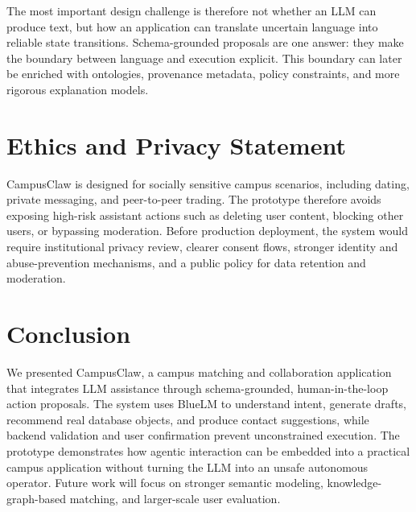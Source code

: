 \documentclass[sigconf]{acmart}
\begin{document}
The most important design challenge is therefore not whether an LLM can produce text, but how an application can translate uncertain language into reliable state transitions. Schema-grounded proposals are one answer: they make the boundary between language and execution explicit. This boundary can later be enriched with ontologies, provenance metadata, policy constraints, and more rigorous explanation models.

\section{Ethics and Privacy Statement}
CampusClaw is designed for socially sensitive campus scenarios, including dating, private messaging, and peer-to-peer trading. The prototype therefore avoids exposing high-risk assistant actions such as deleting user content, blocking other users, or bypassing moderation. Before production deployment, the system would require institutional privacy review, clearer consent flows, stronger identity and abuse-prevention mechanisms, and a public policy for data retention and moderation.

\section{Conclusion}
We presented CampusClaw, a campus matching and collaboration application that integrates LLM assistance through schema-grounded, human-in-the-loop action proposals. The system uses BlueLM to understand intent, generate drafts, recommend real database objects, and produce contact suggestions, while backend validation and user confirmation prevent unconstrained execution. The prototype demonstrates how agentic interaction can be embedded into a practical campus application without turning the LLM into an unsafe autonomous operator. Future work will focus on stronger semantic modeling, knowledge-graph-based matching, and larger-scale user evaluation.
\end{document}
